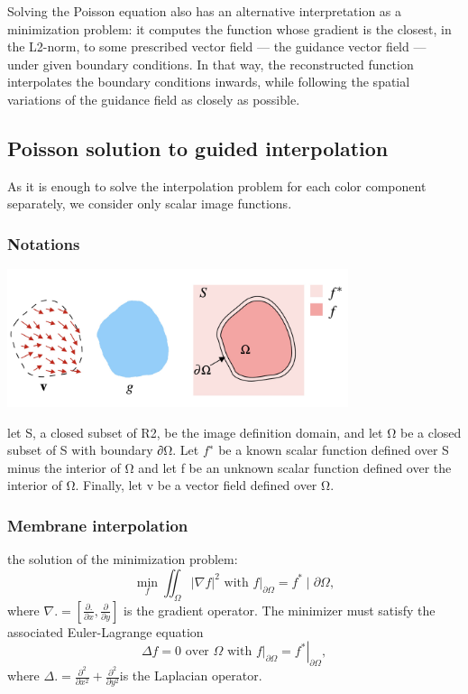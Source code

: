 \documentclass[10pt, a4paper]{article}%
\begin{document}
Solving the Poisson equation also has an alternative interpretation as a minimization problem: it computes the function whose gradient is the closest, in the L2-norm, to some prescribed vector field — the guidance vector field — under given boundary conditions. In that way, the reconstructed function interpolates the boundary conditions inwards, while following the spatial variations of the guidance field as closely as possible.
\subsection{Poisson solution to guided interpolation}
As it is enough to solve the interpolation problem for each color component separately, we consider only scalar image functions. 
\subsubsection{Notations}
\begin{center}
    \includegraphics[width = 10cm]{notation.jpg}
\end{center}

let S, a closed subset of R2, be the image definition domain, and let Ω be a closed subset of S with boundary ∂Ω. Let $f^∗$  be a known scalar function defined over S minus the interior of Ω and let f be an unknown scalar function defined over the interior of Ω. Finally, let v be a vector field defined over Ω.
\subsubsection{Membrane interpolation}
 the solution of the minimization problem:
 \begin{equation}
      \min _f \iint_{\Omega}|\nabla f|^2 \text { with }\left.f\right|_{\partial \Omega}=f^* \mid \partial \Omega,
 \end{equation}
 where $\nabla .=\left[\frac{\partial .}{\partial x}, \frac{\partial}{\partial y}\right]$ is the gradient operator. The minimizer must satisfy the associated Euler-Lagrange equation
 \begin{equation}
     \Delta f=0 \text { over } \Omega \text { with }\left.f\right|_{\partial \Omega}=\left.f^*\right|_{\partial \Omega},
 \end{equation}
 where $\Delta .=\frac{\partial^2}{\partial x^2}+\frac{\partial^2}{\partial y^2}$is the Laplacian operator.
\end{document}
